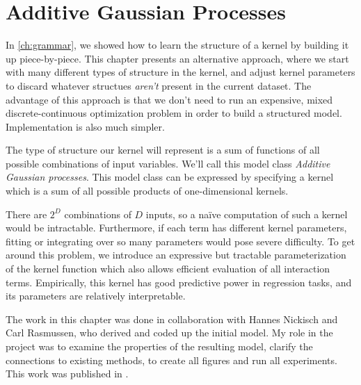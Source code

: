 
\inbpdocument



\chapter{Additive Gaussian Processes}
\label{ch:additive}


In \cref{ch:grammar}, we showed how to learn the structure of a kernel by building it up piece-by-piece.
This chapter presents an alternative approach, where we start with many different types of structure in the kernel, and adjust kernel parameters to discard whatever structues \emph{aren't} present in the current dataset.
The advantage of this approach is that we don't need to run an expensive, mixed discrete-continuous optimization problem in order to build a structured model.
Implementation is also much simpler.

The type of structure our kernel will represent is a sum of functions of all possible combinations of input variables.
We'll call this model class \emph{Additive Gaussian processes}.
This model class can be expressed by specifying a kernel which is a sum of all possible products of one-dimensional kernels.

There are $2^D$ combinations of $D$ inputs, so a na\"{i}ve computation of such a kernel would be intractable.
Furthermore, if each term has different kernel parameters, fitting or integrating over so many parameters would pose severe difficulty.
To get around this problem, we introduce an expressive but tractable parameterization of the kernel function which also allows efficient evaluation of all interaction terms.
Empirically, this kernel has good predictive power in regression tasks, and its parameters are relatively interpretable.

The work in this chapter was done in collaboration with Hannes Nickisch and Carl Rasmussen, who derived and coded up the initial model.
My role in the project was to examine the properties of the resulting model, clarify the connections to existing methods, to create all figures and run all experiments.
This work was published in \citep{duvenaud2011additive11}.



